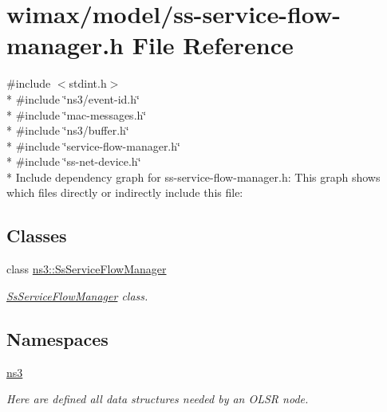 \hypertarget{ss-service-flow-manager_8h}{}\section{wimax/model/ss-\/service-\/flow-\/manager.h File Reference}
\label{ss-service-flow-manager_8h}
{\ttfamily \#include $<$stdint.\+h$>$}\\*
{\ttfamily \#include \char`\"{}ns3/event-\/id.\+h\char`\"{}}\\*
{\ttfamily \#include \char`\"{}mac-\/messages.\+h\char`\"{}}\\*
{\ttfamily \#include \char`\"{}ns3/buffer.\+h\char`\"{}}\\*
{\ttfamily \#include \char`\"{}service-\/flow-\/manager.\+h\char`\"{}}\\*
{\ttfamily \#include \char`\"{}ss-\/net-\/device.\+h\char`\"{}}\\*
Include dependency graph for ss-\/service-\/flow-\/manager.h\+:
This graph shows which files directly or indirectly include this file\+:
\subsection*{Classes}
\begin{DoxyCompactItemize}
\item 
class \hyperlink{classns3_1_1SsServiceFlowManager}{ns3\+::\+Ss\+Service\+Flow\+Manager}
\begin{DoxyCompactList}\small\item\em \hyperlink{classns3_1_1SsServiceFlowManager}{Ss\+Service\+Flow\+Manager} class. \end{DoxyCompactList}\end{DoxyCompactItemize}
\subsection*{Namespaces}
\begin{DoxyCompactItemize}
\item 
 \hyperlink{namespacens3}{ns3}
\begin{DoxyCompactList}\small\item\em Here are defined all data structures needed by an O\+L\+SR node. \end{DoxyCompactList}\end{DoxyCompactItemize}
